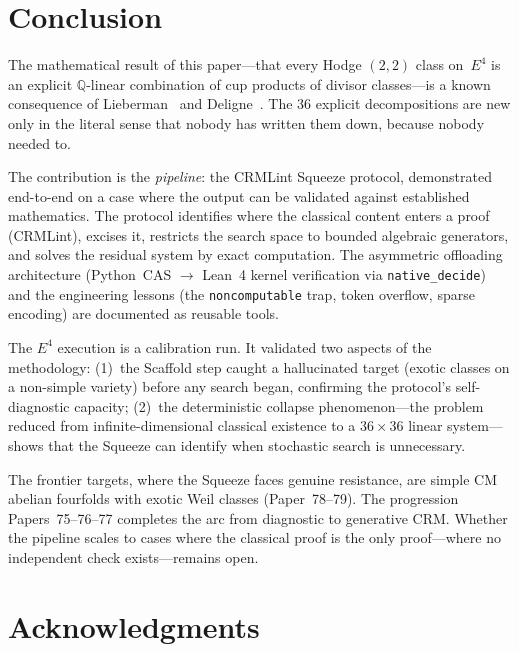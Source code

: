 \documentclass[11pt]{article}
\theoremstyle{plain}
\theoremstyle{definition}
\theoremstyle{remark}
\newcommand{\Q}{\mathbb{Q}}
\begin{document}
\section{Conclusion}\label{sec:conclusion}

The mathematical result of this paper---that every Hodge
$(2,2)$ class on~$E^4$ is an explicit $\Q$-linear combination
of cup products of divisor classes---is a known consequence
of Lieberman~\cite{Lieberman1968} and Deligne~\cite{Deligne1982}.
The 36 explicit decompositions are new only in the literal sense
that nobody has written them down, because nobody needed to.

The contribution is the \emph{pipeline}: the CRMLint Squeeze
protocol, demonstrated end-to-end on a case where the output can
be validated against established mathematics.  The protocol
identifies where the classical content enters a proof (CRMLint),
excises it, restricts the search space to bounded algebraic
generators, and solves the residual system by exact computation.
The asymmetric offloading architecture (Python~CAS $\to$ Lean~4
kernel verification via \texttt{native\_decide}) and the
engineering lessons (the \texttt{noncomputable} trap, token
overflow, sparse encoding) are documented as reusable tools.

The $E^4$ execution is a calibration run.  It validated two
aspects of the methodology: (1)~the Scaffold step caught a
hallucinated target (exotic classes on a non-simple variety)
before any search began, confirming the protocol's
self-diagnostic capacity; (2)~the deterministic collapse
phenomenon---the problem reduced from infinite-dimensional
classical existence to a $36 \times 36$ linear system---shows
that the Squeeze can identify when stochastic search is
unnecessary.

The frontier targets, where the Squeeze faces genuine resistance,
are simple CM abelian fourfolds with exotic Weil classes
(Paper~78--79).  The progression Papers~75--76--77 completes the
arc from diagnostic to generative CRM.  Whether the pipeline
scales to cases where the classical proof is the only proof---where
no independent check exists---remains open.

\section*{Acknowledgments}
\end{document}
